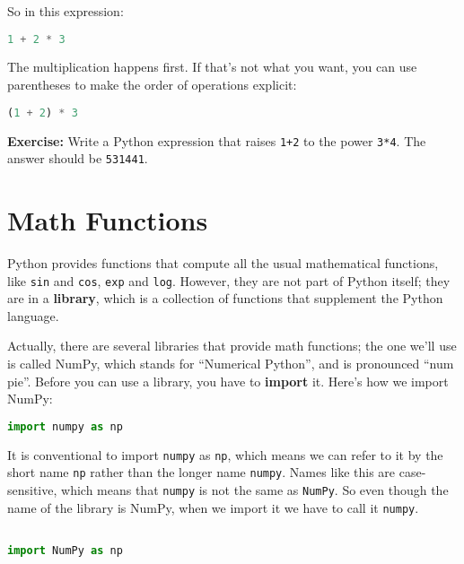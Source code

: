 So in this expression:

\begin{lstlisting}[language=Python,style=source]
1 + 2 * 3
\end{lstlisting}

The multiplication happens first. If that's not what you want, you can
use parentheses to make the order of operations explicit:

\begin{lstlisting}[language=Python,style=source]
(1 + 2) * 3
\end{lstlisting}

\textbf{Exercise:} Write a Python expression that raises
\passthrough{\lstinline!1+2!} to the power
\passthrough{\lstinline!3*4!}. The answer should be
\passthrough{\lstinline!531441!}.

\hypertarget{math-functions}{%
\section{Math Functions}\label{math-functions}}

Python provides functions that compute all the usual mathematical
functions, like \passthrough{\lstinline!sin!} and
\passthrough{\lstinline!cos!}, \passthrough{\lstinline!exp!} and
\passthrough{\lstinline!log!}. However, they are not part of Python
itself; they are in a \textbf{library}, which is a collection of
functions that supplement the Python language.

Actually, there are several libraries that provide math functions; the
one we'll use is called NumPy, which stands for ``Numerical Python'',
and is pronounced ``num pie''. Before you can use a library, you have to
\textbf{import} it. Here's how we import NumPy:

\begin{lstlisting}[language=Python,style=source]
import numpy as np
\end{lstlisting}

It is conventional to import \passthrough{\lstinline!numpy!} as
\passthrough{\lstinline!np!}, which means we can refer to it by the
short name \passthrough{\lstinline!np!} rather than the longer name
\passthrough{\lstinline!numpy!}. Names like this are case-sensitive,
which means that \passthrough{\lstinline!numpy!} is not the same as
\passthrough{\lstinline!NumPy!}. So even though the name of the library
is NumPy, when we import it we have to call it
\passthrough{\lstinline!numpy!}.

\begin{lstlisting}[language=Python,style=source]
%%expect ModuleNotFoundError

import NumPy as np
\end{lstlisting}

